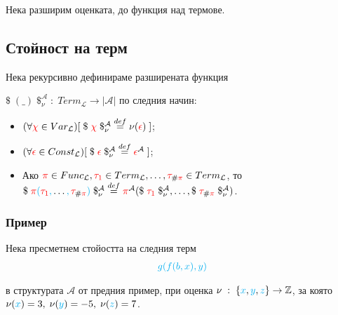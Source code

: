 \documentclass{article}[12pt]
\newcommand{\Lang}{\mathcal{L}}
\begin{document}
\vspace{0.3cm}

Нека разширим оценката, до функция над термове.

\subsection{Стойност на терм}

Нека рекурсивно дефинираме разширената функция

\(\$ \; (\_) \; \$^{\mathcal{A}}_\nu \; : \; Term_\Lang \to |\mathcal{A}|\)
по следния начин:

\begin{itemize}
\item \((\forall \color{red} \chi \color{black} \in Var_\Lang)[\; \$ \; \color{red} \chi \color{black} \; \$^{\mathcal{A}}_\nu \overset{def}{=} \nu(\color{red} \epsilon \color{black}) \; ]\);
\item \((\forall \color{red} \epsilon \color{black} \in Const_\Lang)[\; \$ \; \color{red} \epsilon \color{black} \; \$^{\mathcal{A}}_\nu \overset{def}{=} \color{red} \epsilon \color{black}^{\mathcal{A}} \; ]\);
\item Ако \(\color{red} \pi \color{black} \in Func_\Lang, \color{red}  \tau_1 \color{black} \in Term_\Lang, \dots, \color{red} \tau_{\color{black} \# \color{red} \pi} \color{black} \in Term_\Lang\), то \\
\(\$ \; \color{red} \pi  \color{cyan} ( \color{red} \tau_1 \color{cyan} , \color{black} \dots \color{cyan} , \color{red} \tau_{\color{black} \# \color{red} \pi} \color{cyan} ) \color{black} \; \$^{\mathcal{A}}_\nu \overset{def}{=} \color{red} \pi \color{black}^{\mathcal{A}}( \$ \; \color{red} \tau_1 \color{black} \; \$^{\mathcal{A}}_\nu, \dots , \$ \; \color{red} \tau_{\color{black} \# \color{red} \pi} \color{black} \; \$^{\mathcal{A}}_\nu  )\).
\end{itemize}

\subsubsection{Пример}
Нека пресметнем стойостта на следния терм
\begin{align*}
\color{cyan} g(f(b, x), y)
\end{align*}

в структурата \(\mathcal{A}\) от предния пример,
при оценка \(\nu \; : \; \{\color{cyan} x \color{black}, \color{cyan} y \color{black} , \color{cyan} z \color{black} \} \to \mathbb{Z}\),
за която \(\nu(\color{cyan} x \color{black}) = 3, \; \nu(\color{cyan} y \color{black}) = -5, \; \nu(\color{cyan} z \color{black}) = 7\).
\end{document}
